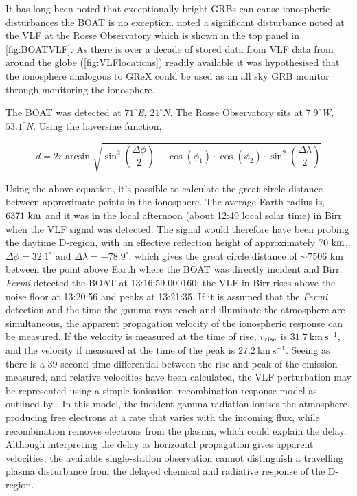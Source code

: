 It has long been noted that exceptionally bright GRBs can cause ionospheric disturbances \citep{fishman_observation_1988} the BOAT is no exception. \citet{hayes_significant_2022} noted a significant disturbance noted at the VLF at the Rosse Observatory which is shown in the top panel in \cref{fig:BOATVLF}. As there is over a decade of stored data from VLF data from around the globe (\cref{fig:VLFlocations}) readily available it was hypothesised that the ionosphere analogous to GReX could be used as an all sky GRB monitor through monitoring the ionosphere. 

The BOAT was detected at $71^\circ$\textit{E}, $21^\circ$\textit{N}. The Rosse Observatory sits at  $7.9^\circ$\textit{W}, $53.1^\circ$\textit{N}. Using the haversine function, 

\begin{equation}
    d = 2r \arcsin\sqrt{\sin^2\left(\frac{\Delta \phi}{2}\right) + 
    \cos(\phi_1) \cdot \cos(\phi_2) \cdot 
    \sin^2\left(\frac{\Delta \lambda}{2}\right) }
\end{equation}

Using the above equation, it's possible to calculate the great circle distance between approximate points in the ionosphere. The average Earth radius is, $6371 \rm ~km$ and it was in the local afternoon (about 12:49 local solar time) in Birr when the VLF signal was detected. The signal would therefore have been probing the daytime D-region, with an effective reflection height of approximately $70~\rm km$,.  $\Delta\phi = 32.1^\circ$ and $\Delta \lambda = -78.9^\circ$, which gives the great circle distance of $\sim 7506$ km between the point above Earth where the BOAT was directly incident and Birr. \textit{Fermi} detected the BOAT at 13:16:59.000160; the VLF in Birr rises above the noise floor at 13:20:56 and peaks at 13:21:35. If it is assumed that the \textit{Fermi} detection and the time the gamma rays reach and illuminate the atmosphere are simultaneous, the apparent propagation velocity of the ionospheric response can be measured. If the velocity is measured at the time of rise, $v_{\rm rise}$ is $31.7~\text{km}~\text{s}^{-1}$, and the velocity if measured at the time of the peak is $27.2~\text{km}~\text{s}^{-1}$. Seeing as there is a 39-second time differential between the rise and peak of the emission measured, and relative velocities have been calculated, the VLF perturbation may be represented using a simple ionisation–recombination response model as outlined by \cite{hayes_solar_2021}. In this model, the incident gamma radiation ionises the atmosphere, producing free electrons at a rate that varies with the incoming flux, while recombination removes electrons from the plasma, which could explain the delay. Although interpreting the delay as horizontal propagation gives apparent velocities, the available single-station observation cannot distinguish a travelling plasma disturbance from the delayed chemical and radiative response of the D-region.



